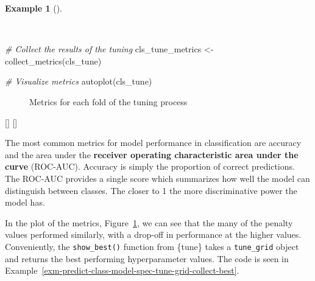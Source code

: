 \documentclass[
  letterpaper,
  krantz1]{latex/krantz-mod}
\newenvironment{Shaded}{\begin{snugshade}}{\end{snugshade}}
\newcommand{\CommentTok}[1]{\textcolor[rgb]{0.00,0.00,0.00}{\textit{#1}}}
\newcommand{\FunctionTok}[1]{\textcolor[rgb]{0.00,0.00,0.00}{#1}}
\newcommand{\NormalTok}[1]{\textcolor[rgb]{0.00,0.00,0.00}{#1}}
\newcommand{\OtherTok}[1]{\textcolor[rgb]{0.00,0.00,0.00}{#1}}
\newcommand{\cindex}[1]{%
  \StrSubstitute{#1}{_}{\_}[\temp]%
  \index{\temp}%
}
\theoremstyle{definition}
\theoremstyle{definition}
\newtheorem{example}{Example}[chapter]
\theoremstyle{remark}
\begin{document}
\begin{example}[]\protect\hypertarget{exm-predict-class-model-spec-tune-grid-collect}{}\label{exm-predict-class-model-spec-tune-grid-collect}

~

\begin{Shaded}
\begin{Highlighting}[numbers=left,,]
\CommentTok{\# Collect the results of the tuning}
\NormalTok{cls\_tune\_metrics }\OtherTok{\textless{}{-}}
  \FunctionTok{collect\_metrics}\NormalTok{(cls\_tune)}

\CommentTok{\# Visualize metrics}
\FunctionTok{autoplot}\NormalTok{(cls\_tune)}
\end{Highlighting}
\end{Shaded}

\begin{figure}[!htb]


\caption{\label{fig-predict-class-model-spec-tune-grid-collect}Metrics
for each fold of the tuning process}

\end{figure}%

\cindex{collect_metrics()}\cindex{autoplot()}

\end{example}

The most common metrics for model performance in classification are
accuracy and the area under the \textbf{receiver
operating characteristic area under the curve}
(ROC-AUC).
Accuracy is simply the proportion of correct predictions. The ROC-AUC
provides a single score which summarizes how well the model can
distinguish between classes. The closer to 1 the more discriminative
power the model has.

In the plot of the metrics,
Figure~\ref{fig-predict-class-model-spec-tune-grid-collect}, we can see
that the many of the penalty values performed similarly, with a drop-off
in performance at the higher values. Conveniently, the
\texttt{show\_best()} function from \{tune\} takes a \texttt{tune\_grid}
object and returns the best performing hyperparameter
values. The code is seen in
Example~\ref{exm-predict-class-model-spec-tune-grid-collect-best}.
\end{document}
